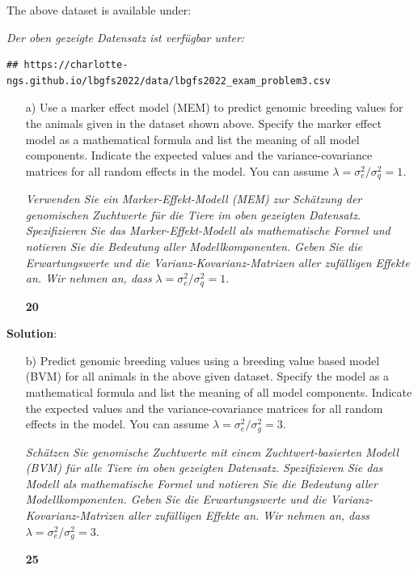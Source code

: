 \documentclass[
]{article}
\newcommand{\points}[1]
{\begin{flushright}\textbf{#1}\end{flushright}}
\newcommand{\solstart}
{\vspace{3ex}\textbf{Solution}:}
\begin{document}
The above dataset is available under:

\textit{Der oben gezeigte Datensatz ist verfügbar unter:}

\begin{verbatim}
## https://charlotte-ngs.github.io/lbgfs2022/data/lbgfs2022_exam_problem3.csv
\end{verbatim}

\vspace{3ex}
\begin{enumerate}
\item[a)] Use a marker effect model (MEM) to predict genomic breeding values for the animals given in the dataset shown above. Specify the marker effect model as a mathematical formula and list the meaning of all model components. Indicate the expected values and the variance-covariance matrices for all random effects in the model. You can assume $\lambda = \sigma_e^2 / \sigma_q^2 = 1$.

\textit{Verwenden Sie ein Marker-Effekt-Modell (MEM) zur Schätzung der genomischen Zuchtwerte für die Tiere im oben gezeigten Datensatz. Spezifizieren Sie das Marker-Effekt-Modell als mathematische Formel und notieren Sie die Bedeutung aller Modellkomponenten. Geben Sie die Erwartungswerte und die Varianz-Kovarianz-Matrizen aller zufälligen Effekte an. Wir nehmen an, dass } $\lambda = \sigma_e^2 / \sigma_q^2 = 1$.
\points{20}
\end{enumerate}

\clearpage
\pagebreak

\solstart

\clearpage
\pagebreak

\begin{enumerate}
\item[b)] Predict genomic breeding values using a breeding value based model (BVM) for all animals in the above given dataset. Specify the model as a mathematical formula and list the meaning of all model components. Indicate the expected values and the variance-covariance matrices for all random effects in the model. You can assume $\lambda = \sigma_e^2 / \sigma_g^2 = 3$.

\textit{Schätzen Sie genomische Zuchtwerte mit einem Zuchtwert-basierten Modell (BVM) für alle Tiere im oben gezeigten Datensatz. Spezifizieren Sie das Modell als mathematische Formel und notieren Sie die Bedeutung aller Modellkomponenten. Geben Sie die Erwartungswerte und die Varianz-Kovarianz-Matrizen aller zufälligen Effekte an. Wir nehmen an, dass } $\lambda = \sigma_e^2 / \sigma_g^2 = 3$.
\points{25}
\end{enumerate}
\end{document}
